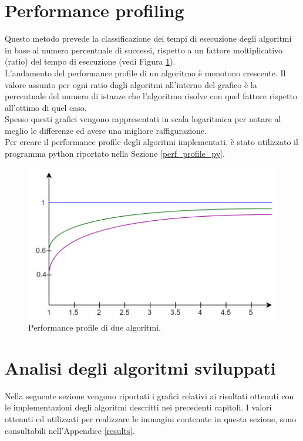 \section{Performance profiling}
Questo metodo prevede la classificazione dei tempi di esecuzione degli algoritmi in base al numero percentuale di successi, rispetto a un fattore moltiplicativo (ratio) del tempo di esecuzione (vedi Figura \ref{perf_profile}).\\
L'andamento del performance profile di un algoritmo è monotono crescente. Il valore assunto per ogni ratio dagli algoritmi all'interno del grafico è la percentuale del numero di istanze che l'algoritmo risolve con quel fattore rispetto all'ottimo di quel caso.\\
Spesso questi grafici vengono rappresentati in scala logaritmica per notare al meglio le differenze ed avere una migliore raffigurazione.\\
Per creare il performance profile degli algoritmi implementati, è stato utilizzato il programma python riportato nella Sezione \ref{perf_profile_py}. 

\begin{figure}[h] 
\begin{center} 
  \includegraphics[scale=0.3]{Images/perf_profile} 
  \caption{\footnotesize{Performance profile di due algoritmi.}}
  \label{perf_profile} 
\end{center} 
\end{figure}

\section{Analisi degli algoritmi sviluppati}
Nella seguente sezione vengono riportati i grafici relativi ai risultati ottenuti con le implementazioni degli algoritmi descritti nei precedenti capitoli. I valori ottenuti ed utilizzati per realizzare le immagini contenute in questa sezione, sono consultabili nell'Appendice \ref{results}.

